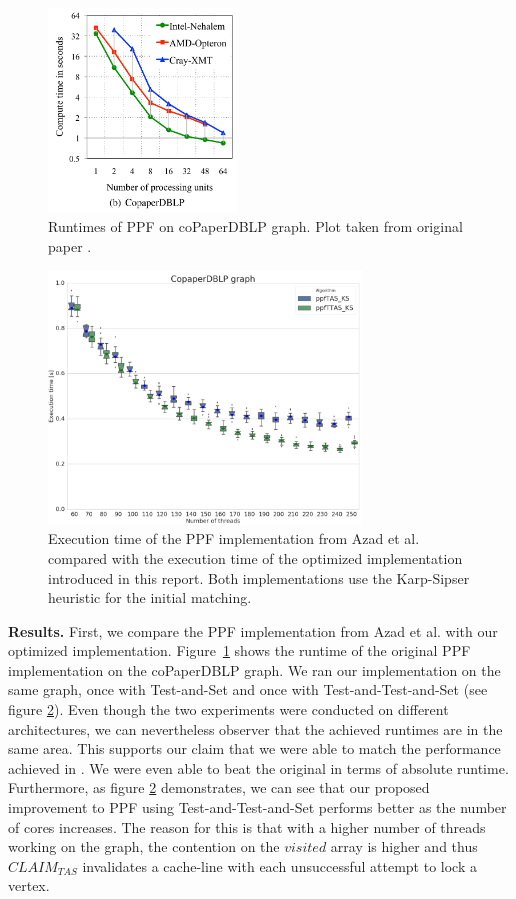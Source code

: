 \documentclass[letterpaper]{article}
\newcommand{\mypar}[1]{{\bf #1.}}
\begin{document}
\begin{figure}\centering
	\includegraphics[width=5cm]{../../plot/output/report/coPaperAzadPlot.png}
    \caption{Runtimes of PPF on coPaperDBLP graph. Plot taken from original paper \cite{Azad:2012}.}
	\label{fig:azadCopaper}
\end{figure}


\begin{figure}\centering
	\includegraphics[width=8.3cm]{../../plot/output/report/coPaperDBLP_PPFTASvsPPFTTAS.png}
	\caption{Execution time of the PPF implementation from Azad et al. compared with the execution time of the optimized implementation introduced in this report. Both implementations use the Karp-Sipser heuristic for the initial matching.}
	\label{fig:tasvsttas}
\end{figure}


\mypar{Results} First, we compare the PPF implementation from Azad et al. with our optimized implementation. 
Figure~\ref{fig:azadCopaper} shows the runtime of the original PPF implementation on the coPaperDBLP graph. 
We ran our implementation on the same graph, once with Test-and-Set and once with Test-and-Test-and-Set (see figure \ref{fig:tasvsttas}). 
Even though the two experiments were conducted on different architectures, we can nevertheless observer that the achieved runtimes are in the same area. 
This supports our claim that we were able to match the performance achieved in \cite{Azad:2012}. 
We were even able to beat the original in terms of absolute runtime.
Furthermore, as figure \ref{fig:tasvsttas} demonstrates, we can see that our proposed improvement to PPF using Test-and-Test-and-Set performs 
better as the number of cores increases. The reason for this is that with a higher number of threads working on the graph, 
the contention on the $visited$ array is higher and thus \texttt{$CLAIM_{TAS}$} invalidates a cache-line with each unsuccessful attempt to lock a vertex.\\
 
\end{document}
